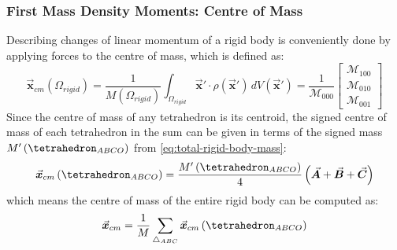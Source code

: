\documentclass[oneside, a4paper]{book}
\newcommand\vek[1]{\vec{\bm{#1}}}
\newcommand\br[1]{\left(#1\right)}
\begin{document}
  \subsubsection{First Mass Density Moments: Centre of Mass}\label{subsubsec:centre-of-mass}
  Describing changes of linear momentum of a rigid body is conveniently done by applying forces to the centre of mass, which is defined as:
  \begin{equation}
    \vek{x}_{cm}\br{\Omega_{rigid}} = \frac{1}{M\br{\Omega_{rigid}}}\int_{\Omega_{rigid}} \vek{x}' \cdot \rho\br{\vek{x}'} \, dV\br{\vek{x}'} = \frac{1}{\mathcal{M}_{000}}\begin{bmatrix}
      \mathcal{M}_{100}\\
      \mathcal{M}_{010}\\
      \mathcal{M}_{001}
    \end{bmatrix}
  \end{equation}
  Since the centre of mass of any tetrahedron is its centroid, the signed centre of mass of each tetrahedron in the sum can be given in terms of the signed mass $M'\br{\tetrahedron_{ABCO}}$ from \autoref{eq:total-rigid-body-mass}:
  \begin{equation}
    \vek{x}_{cm}\br{\tetrahedron_{ABCO}} = \frac{M'\br{\tetrahedron_{ABCO}}}{4}\br{\vek{A}+\vek{B}+\vek{C}}
  \end{equation}
  which means the centre of mass of the entire rigid body can be computed as:
  \begin{equation}
    \vek{x}_{cm} = \frac{1}{M} \sum_{\triangle_{ABC}}\vek{x}_{cm}\br{\tetrahedron_{ABCO}}
  \end{equation}
\end{document}

